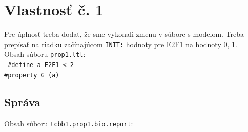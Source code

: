 \documentclass[11pt,final,oneside]{fithesis}
\begin{document}
\chapter{Vlastnos\v t \v c. 1}
\label{sec:caseProp1File}
Pre \'uplnos\v t treba doda\v t, \v ze sme vykonali zmenu v s\'ubore s modelom. Treba prep\'isa\v t na riadku za\v c\'inaj\'ucom 
{\tt INIT:} hodnoty pre {E2F1} na hodnoty 0, 1.\\

\noindent
Obsah s\'uboru {\tt prop1.ltl}:\\

{\tt
\noindent
\#define a E2F1 < 2\\

\noindent
\#property G (a)\\
}

\section{Spr\'ava}
\label{sec:prop1report}
Obsah s\'uboru {\tt tcbb1.prop1.bio.report}:\\
\end{document}
